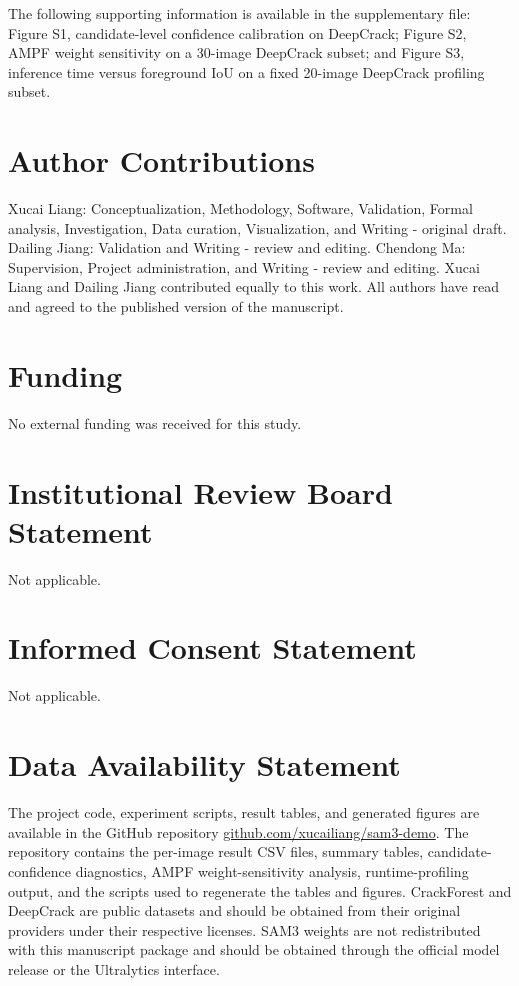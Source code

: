 \documentclass[applsci,article,submit,pdftex,moreauthors]{Definitions/mdpi}
\begin{document}
The following supporting information is available in the supplementary
file: Figure S1, candidate-level confidence calibration on DeepCrack;
Figure S2, AMPF weight sensitivity on a 30-image DeepCrack subset; and
Figure S3, inference time versus foreground IoU on a fixed 20-image
DeepCrack profiling subset.

\section{Author Contributions}

Xucai Liang: Conceptualization, Methodology, Software, Validation,
Formal analysis, Investigation, Data curation, Visualization, and
Writing - original draft. Dailing Jiang: Validation and Writing -
review and editing. Chendong Ma: Supervision, Project administration,
and Writing - review and editing. Xucai Liang and Dailing Jiang
contributed equally to this work. All authors have read and agreed to
the published version of the manuscript.

\section{Funding}

No external funding was received for this study.

\section{Institutional Review Board Statement}

Not applicable.

\section{Informed Consent Statement}

Not applicable.

\section{Data Availability Statement}

The project code, experiment scripts, result tables, and generated
figures are available in the GitHub repository
\href{https://github.com/xucailiang/sam3-demo}{github.com/xucailiang/sam3-demo}.
The repository contains the per-image result CSV files, summary tables,
candidate-confidence diagnostics, AMPF weight-sensitivity analysis,
runtime-profiling output, and the scripts used to regenerate the tables
and figures. CrackForest and DeepCrack are public datasets and should
be obtained from their original providers under their respective
licenses. SAM3 weights are not redistributed with this manuscript
package and should be obtained through the official model release or the
Ultralytics interface.
\end{document}
